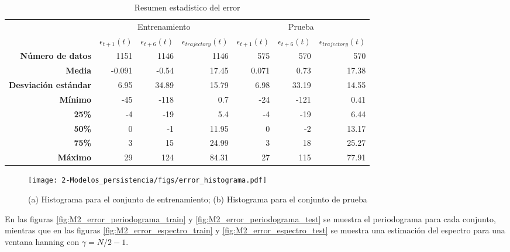 \begin{table}[H]
	\centering
	\begin{tabular}{rrrr|rrr}
		\hline \hline
		& \multicolumn{3}{c|}{Entrenamiento} & \multicolumn{3}{c}{Prueba} \\
		& $\epsilon_{t+1}(t)$  & $\epsilon_{t+6}(t)$       & $\epsilon_{trajectory}(t)$     & $\epsilon_{t+1}(t)$      & $\epsilon_{t+6}(t)$      &$\epsilon_{trajectory}(t)$     \\ \hline
		\textbf{Número de datos}     & 1151       & 1146      & 1146      & 575     & 570     & 570    \\
		\textbf{Media}               & -0.091     & -0.54     & 17.45     & 0.071   & 0.73    & 17.38  \\
		\textbf{Desviación estándar} & 6.95       & 34.89     & 15.79     & 6.98    & 33.19   & 14.55  \\
		\textbf{Mínimo}              & -45        & -118      & 0.7       & -24     & -121    & 0.41   \\
		\textbf{25\%}                & -4         & -19       & 5.4       & -4      & -19     & 6.44   \\
		\textbf{50\%}                & 0          & -1        & 11.95     & 0       & -2      & 13.17  \\
		\textbf{75\%}                & 3          & 15        & 24.99     & 3       & 18      & 25.27  \\
		\textbf{Máximo}              & 29         & 124       & 84.31     & 27      & 115     & 77.91  \\ \hline \hline
	\end{tabular}
	\caption{Resumen estadístico del error}
	\label{table:M2_error}
\end{table}




\begin{figure}[H]
	\centering
	\texttt{[image: 2-Modelos\_persistencia/figs/error\_histograma.pdf]}
	\caption{(a) Histograma para el conjunto de entrenamiento; (b) Histograma para el conjunto de prueba}
	\label{fig:M2_histograma_error}
\end{figure}


En las figuras \ref{fig:M2_error_periodograma_train} y \ref{fig:M2_error_periodograma_test} se muestra el periodograma para cada conjunto, mientras que en las figuras \ref{fig:M2_error_espectro_train} y \ref{fig:M2_error_espectro_test} se muestra una estimación del espectro para 
una ventana hanning con $\gamma = N/2 - 1$.


